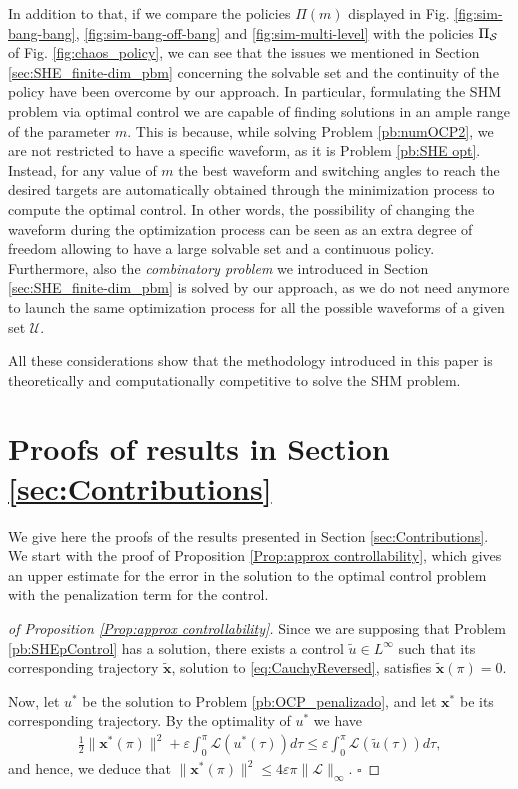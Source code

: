 \documentclass[twocolumn]{autart}    %
\begin{document}
In addition to that, if we compare the policies $\Pi(m)$ displayed in Fig. \ref{fig:sim-bang-bang}, \ref{fig:sim-bang-off-bang} and \ref{fig:sim-multi-level} with the policies $\Pi_{\mathcal{S}}$ of Fig. \ref{fig:chaos_policy}, we can see that the issues we mentioned in Section \ref{sec:SHE_finite-dim_pbm} concerning the solvable set and the continuity of the policy have been overcome by our approach. In particular, formulating the SHM problem via optimal control we are capable of finding solutions in an ample range of the parameter $m$. This is because, while solving Problem \ref{pb:numOCP2}, we are not restricted to have a specific waveform, as it is Problem \ref{pb:SHE opt}. Instead, for any value of $m$ the best waveform and switching angles to reach the desired targets are automatically obtained through the minimization process to compute the optimal control. In other words, the possibility of changing the waveform during the optimization process can be seen as an extra degree of freedom allowing to have a large solvable set and a continuous policy. Furthermore, also the \textit{combinatory problem} we introduced in Section \ref{sec:SHE_finite-dim_pbm} is solved by our approach, as we do not need anymore to launch the same optimization process for all the possible waveforms of a given set $\mathcal U$. 

All these considerations show that the methodology introduced in this paper is theoretically and computationally competitive to solve the SHM problem.

\section{Proofs of results in Section \ref{sec:Contributions}}\label{sec:Proof}

We give here the proofs of the results presented in Section \ref{sec:Contributions}. We start with the proof of Proposition \ref{Prop:approx controllability}, which gives an upper estimate for the error in the solution to the optimal control problem with the penalization term for the control. 

\bigskip

\begin{proof}[of Proposition \ref{Prop:approx controllability}]
Since we are supposing that Problem \ref{pb:SHEpControl} has a solution, there exists a control $\tilde{u}\in L^\infty$ such that its corresponding trajectory $\tilde{\bm{x}}$, solution to \eqref{eq:CauchyReversed}, satisfies $\tilde{\bm{x}}(\pi) = 0$. 

Now, let $u^\ast$ be the solution to Problem \ref{pb:OCP_penalizado}, and let $\bm{x}^\ast$ be its corresponding trajectory. By the optimality of $u^\ast$ we have
\begin{align*}
	\frac{1}{2} \| \bm{x}^\ast(\pi)\|^2 +\varepsilon \int_0^\pi \mathcal{L}(u^\ast(\tau))d\tau \leq \varepsilon \int_0^\pi \mathcal{L}(\tilde{u}(\tau))d\tau,
\end{align*}
and hence, we deduce that $\| \bm{x}^\ast (\pi)\|^2 \leq 4 \varepsilon \pi \| \mathcal{L}\|_\infty.$ \hfill $\square$
\end{proof}
\end{document}
